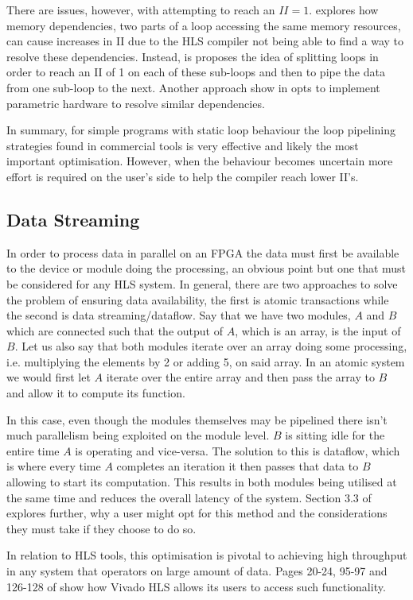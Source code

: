 There are issues, however, with attempting to reach an $II = 1$. \cite{7544750} explores how memory dependencies, two parts of a loop accessing the same memory resources, can cause increases in II due to the HLS compiler not being able to find a way to resolve these dependencies. Instead, is proposes the idea of splitting loops in order to reach an II of 1 on each of these sub-loops and then to pipe the data from one sub-loop to the next. Another approach show in \cite{7160061} opts to implement parametric hardware to resolve similar dependencies. 

In summary, for simple programs with static loop behaviour the loop pipelining strategies found in commercial tools is very effective and likely the most important optimisation. However, when the behaviour becomes uncertain more effort is required on the user's side to help the compiler reach lower II's.

\subsection{Data Streaming}

In order to process data in parallel on an FPGA the data must first be available to the device or module doing the processing, an obvious point but one that must be considered for any HLS system. In general, there are two approaches to solve the problem of ensuring data availability, the first is atomic transactions while the second is data streaming/dataflow. Say that we have two modules, $A$ and $B$ which are connected such that the output of $A$, which is an array, is the input of $B$. Let us also say that both modules iterate over an array doing some processing, i.e. multiplying the elements by 2 or adding 5, on said array. In an atomic system we would first let $A$ iterate over the entire array and then pass the array to $B$ and allow it to compute its function. 

In this case, even though the modules themselves may be pipelined there isn't much parallelism being exploited on the module level. $B$ is sitting idle for the entire time $A$ is operating and vice-versa. The solution to this is dataflow, which is where every time $A$ completes an iteration it then passes that data to $B$ allowing to start its computation. This results in both modules being utilised at the same time and reduces the overall latency of the system. Section 3.3 of \cite{9264692} explores further, why a user might opt for this method and the considerations they must take if they choose to do so. 

In relation to HLS tools, this optimisation is pivotal to achieving high throughput in any system that operators on large amount of data. Pages 20-24, 95-97 and 126-128 of \cite{vivado-optmisation-manual} show how Vivado HLS allows its users to access such functionality.






